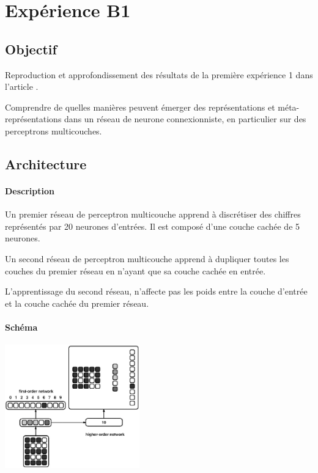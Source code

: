 \section{Expérience B1} 
  \subsection{Objectif}
    Reproduction et approfondissement des résultats de la première expérience 1 dans l'article 
    \cite{Cleeremans_2007}. 

  
  
    Comprendre de quelles manières peuvent émerger des représentations et méta-représentations dans 
    un réseau de neurone connexionniste, en particulier sur des perceptrons multicouches.
  
  
  \subsection{Architecture}
    \paragraph{Description}
      Un premier réseau de perceptron multicouche apprend à discrétiser des chiffres représentés
      par 20 neurones d'entrées. Il est composé d'une couche cachée de 5 neurones.
      
      Un second réseau de perceptron multicouche apprend à dupliquer toutes les couches du premier
      réseau en n'ayant que sa couche cachée en entrée.
      
      L'apprentissage du second réseau, n'affecte pas les poids entre la couche d'entrée et la 
      couche cachée du premier réseau.

    \paragraph{Schéma}
      \begin{center}
	\includegraphics[width=220px]{data/expA1/schema.png}
      \end{center}
      

